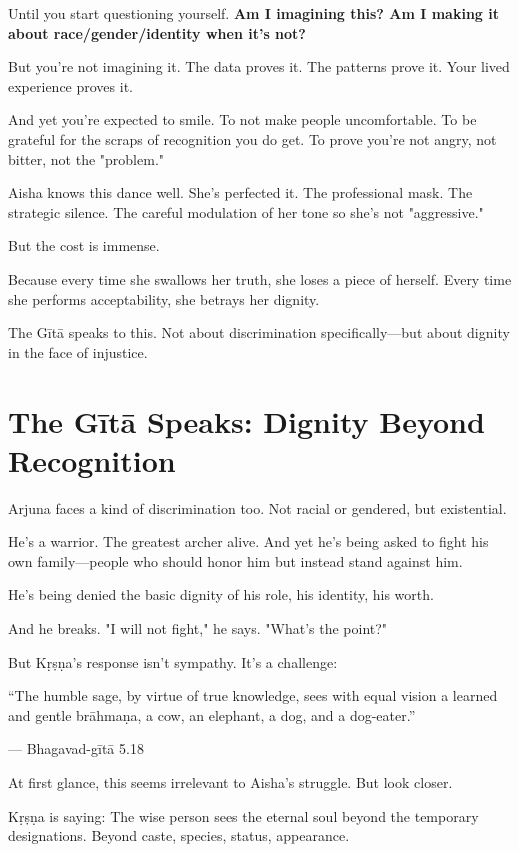 \documentclass[11pt,twoside]{book}
\begin{document}
Until you start questioning yourself. \textbf{Am I imagining this? Am I making it about race/gender/identity when it's not?}

But you're not imagining it. The data proves it. The patterns prove it. Your lived experience proves it.

And yet you're expected to smile. To not make people uncomfortable. To be grateful for the scraps of recognition you do get. To prove you're not angry, not bitter, not the "problem."

Aisha knows this dance well. She's perfected it. The professional mask. The strategic silence. The careful modulation of her tone so she's not "aggressive."

But the cost is immense.

Because every time she swallows her truth, she loses a piece of herself. Every time she performs acceptability, she betrays her dignity.

The Gītā speaks to this. Not about discrimination specifically—but about dignity in the face of injustice.

\section*{The Gītā Speaks: Dignity Beyond Recognition}

Arjuna faces a kind of discrimination too. Not racial or gendered, but existential.

He's a warrior. The greatest archer alive. And yet he's being asked to fight his own family—people who should honor him but instead stand against him.

He's being denied the basic dignity of his role, his identity, his worth.

And he breaks. "I will not fight," he says. "What's the point?"

But Kṛṣṇa's response isn't sympathy. It's a challenge:

\begin{pullquote}
``The humble sage, by virtue of true knowledge, sees with equal vision a learned and gentle brāhmaṇa, a cow, an elephant, a dog, and a dog-eater.''

--- Bhagavad-gītā 5.18
\end{pullquote}

At first glance, this seems irrelevant to Aisha's struggle. But look closer.

Kṛṣṇa is saying: The wise person sees the eternal soul beyond the temporary designations. Beyond caste, species, status, appearance.
\end{document}
